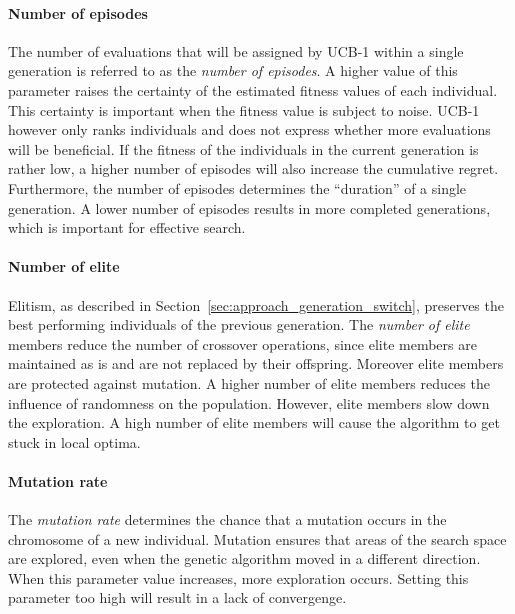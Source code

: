 \paragraph{Number of episodes} The number of evaluations that will be assigned
by UCB-1 within a single generation is referred to as the \emph{number of
episodes}. A higher value of this parameter raises the certainty of the
estimated fitness values of each individual. This certainty is important when
the fitness value is subject to noise. UCB-1 however only ranks individuals and
does not express whether more evaluations will be beneficial. If
the fitness of the individuals in the current generation is rather low, a
higher number of episodes will also increase the cumulative regret.
Furthermore, the number of episodes determines the ``duration'' of a single
generation. A lower number of episodes results in more completed generations,
which is important for effective search.
\paragraph{Number of elite}  Elitism, as described in Section~\ref{sec:approach_generation_switch},
preserves the best performing individuals of the previous generation. The
\emph{number of elite} members reduce the number of crossover operations, since
elite members are maintained as is and are not replaced by their offspring.
Moreover elite members are protected against mutation. A higher number of elite
members reduces the influence of randomness on the population. However, elite
members slow down the exploration. A high number of elite members will cause
the algorithm to get stuck in local optima.
\paragraph{Mutation rate} The \emph{mutation rate} determines the chance that a
mutation occurs in the chromosome of a new individual. Mutation ensures that
areas of the search space are explored, even when the genetic algorithm moved
in a different direction. When this parameter value increases, more exploration
occurs. Setting this parameter too high will result in a lack of convergenge.
